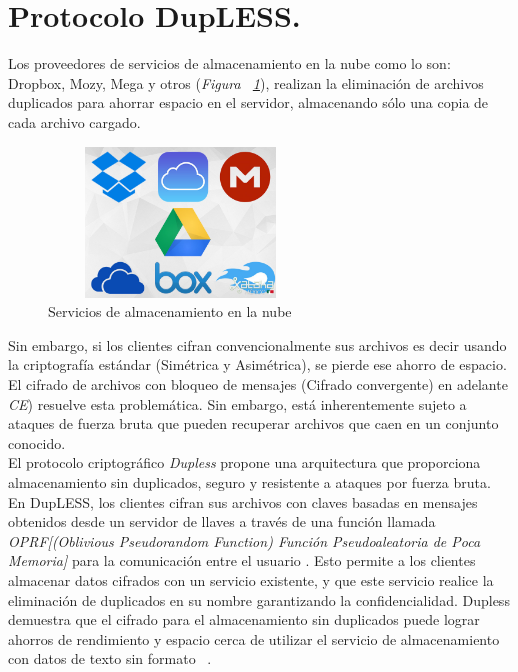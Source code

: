 


\section{Protocolo DupLESS. }
Los proveedores de servicios de almacenamiento en la nube como lo son: Dropbox, Mozy, Mega y otros (\textit{Figura ~\ref{fig:3-1-0}}), realizan la eliminación de archivos duplicados para ahorrar espacio en el servidor, almacenando sólo una copia de cada archivo cargado. \\

\begin{figure}[H]
\centering
\includegraphics[width=7cm, height=4cm]{./images/servicios_nube.jpg}
\caption{Servicios de almacenamiento en la nube}
\label{fig:3-1-0}
\end{figure}


Sin embargo, si los clientes cifran convencionalmente sus archivos es decir usando la criptografía estándar (Simétrica y Asimétrica), se pierde ese ahorro de espacio. El cifrado de archivos con bloqueo de mensajes (Cifrado convergente) en adelante \textit{CE}) resuelve esta problemática. Sin embargo, está inherentemente sujeto a ataques de fuerza bruta que pueden recuperar archivos que caen en un conjunto conocido.\\

El protocolo criptográfico \textit{Dupless} propone una arquitectura que proporciona almacenamiento sin duplicados, seguro y resistente a ataques por fuerza bruta. En DupLESS, los clientes cifran sus archivos con claves basadas en mensajes obtenidos
desde un servidor de llaves a través de una función llamada \textit{OPRF[(Oblivious Pseudorandom Function) Función Pseudoaleatoria de Poca Memoria] } para la comunicación entre el usuario . Esto permite a los clientes almacenar datos cifrados con un servicio existente, y que este servicio realice la eliminación de duplicados en su nombre garantizando la confidencialidad. Dupless demuestra que el cifrado para el almacenamiento sin duplicados puede lograr ahorros de rendimiento y espacio cerca de utilizar el servicio de almacenamiento con datos de texto sin formato ~\cite{dupless}. \\



